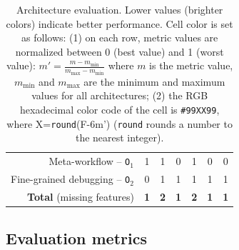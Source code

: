 \documentclass[preprint,3p,twocolumn]{elsarticle}
\begin{document}
\begin{table}
\begin{tabular}{rcccccc}
  Meta-workflow  -- \texttt{O$_1$}    & \cellcolor[HTML]{999999}1
                                     & \cellcolor[HTML]{999999}1
                                     & \cellcolor[HTML]{99FF99}0
                                     & \cellcolor[HTML]{999999}1
                                     & \cellcolor[HTML]{99FF99}0
                                     & \cellcolor[HTML]{99FF99}0\\
  Fine-grained debugging -- \texttt{O$_2$}   & \cellcolor[HTML]{99FF99}0
                                     & \cellcolor[HTML]{999999}1
                                     & \cellcolor[HTML]{999999}1
                                     & \cellcolor[HTML]{999999}1
                                     & \cellcolor[HTML]{999999}1
                                     & \cellcolor[HTML]{999999}1\\
  \textbf{Total} (missing features) & \cellcolor[HTML]{99FF99}\textbf{1}
                                     & \cellcolor[HTML]{999999}\textbf{2}
                                     & \cellcolor[HTML]{99FF99}\textbf{1}
                                     & \cellcolor[HTML]{999999}\textbf{2}
                                     & \cellcolor[HTML]{99FF99}\textbf{1}
                                     & \cellcolor[HTML]{99FF99}\textbf{1}\\
\end{tabular}

\caption{Architecture evaluation. Lower values (brighter colors) indicate better performance. Cell color is set as follows: (1) on each row, metric values are
  normalized between 0 (best value) and 1 (worst value):
  $m'=\frac{m-m_{\mathrm{min}}}{m_{\mathrm{max}}-m_{\mathrm{min}}}$ where
  $m$ is the metric value, $m_{\mathrm{min}}$ and $m_{\mathrm{max}}$
  are the minimum and maximum values for all architectures; (2) the RGB hexadecimal color code of the cell
  is \texttt{\#99XX99}, where X=\texttt{round}(F-6m') (\texttt{round} rounds a number to the nearest integer). }
\label{table:evaluation}
\end{table}

\subsection{Evaluation metrics}
\end{document}
